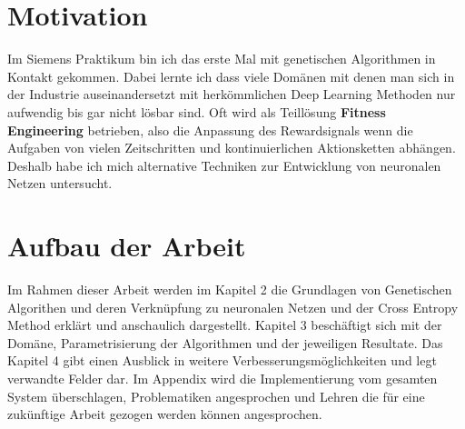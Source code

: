 \section{Motivation}

Im Siemens Praktikum bin ich das erste Mal mit genetischen Algorithmen in Kontakt gekommen. Dabei lernte ich dass viele Domänen mit denen man sich in der Industrie auseinandersetzt mit herkömmlichen Deep Learning Methoden nur aufwendig bis gar nicht lösbar sind. 
Oft wird als Teillösung \textbf{Fitness Engineering} betrieben, also die Anpassung des Rewardsignals wenn die Aufgaben von vielen Zeitschritten und kontinuierlichen Aktionsketten abhängen. Deshalb habe ich mich alternative Techniken zur Entwicklung von neuronalen Netzen untersucht.

\section{Aufbau der Arbeit}


Im Rahmen dieser Arbeit werden im Kapitel 2 die Grundlagen von Genetischen Algorithen und deren Verknüpfung zu neuronalen Netzen und der Cross Entropy Method erklärt und anschaulich dargestellt. Kapitel 3 beschäftigt sich mit der Domäne, Parametrisierung der Algorithmen und der jeweiligen Resultate. Das Kapitel 4 gibt einen Ausblick in weitere Verbesserungsmöglichkeiten und legt verwandte Felder dar. Im Appendix wird die Implementierung vom gesamten System überschlagen, Problematiken angesprochen und Lehren die für eine zukünftige Arbeit gezogen werden können angesprochen.